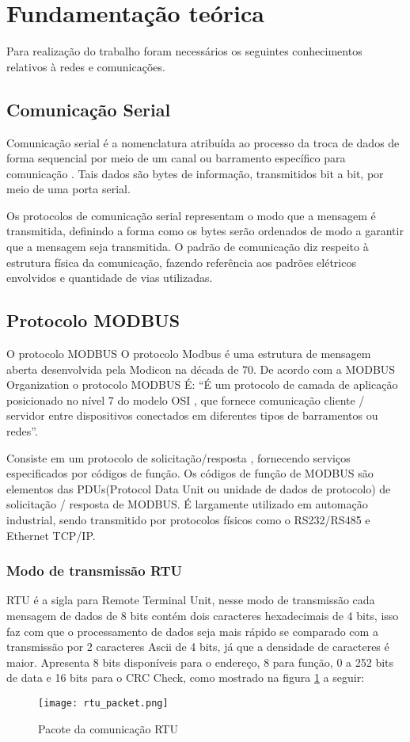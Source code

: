 \section{Fundamentação teórica}
Para realização do trabalho foram necessários os seguintes conhecimentos relativos à redes e comunicações.
\subsection{Comunicação Serial}
Comunicação serial é a nomenclatura atribuída ao processo da troca de dados de forma sequencial por meio de um canal ou barramento específico para comunicação . Tais dados são bytes de informação, transmitidos bit a bit, por meio de uma porta serial.	

Os protocolos de comunicação serial representam o modo que a mensagem é transmitida, definindo a forma como os bytes serão ordenados de modo a garantir que a mensagem seja transmitida.
O padrão de comunicação diz respeito à estrutura física da comunicação, fazendo referência aos padrões elétricos envolvidos e quantidade de vias utilizadas.
\subsection{Protocolo MODBUS}
O protocolo MODBUS O protocolo Modbus é uma estrutura de mensagem aberta desenvolvida pela Modicon na década de 70. De acordo com a MODBUS Organization o protocolo MODBUS É:  “É um protocolo de camada de aplicação posicionado no nível 7 do modelo OSI , que fornece comunicação cliente / servidor entre dispositivos conectados em diferentes tipos de barramentos ou redes”. 

Consiste em um protocolo de solicitação/resposta , fornecendo serviços especificados por códigos de função. Os códigos de função de MODBUS são elementos das PDUs(Protocol Data Unit ou unidade de dados de protocolo) de solicitação / resposta de MODBUS.
É largamente utilizado em automação industrial, sendo transmitido por protocolos físicos como o RS232/RS485 e Ethernet TCP/IP. 

\subsubsection{Modo de transmissão RTU}
RTU é a sigla para Remote Terminal Unit, nesse modo de transmissão cada mensagem de dados de 8 bits contém dois caracteres hexadecimais de 4 bits, isso faz com que o processamento de dados seja mais rápido se comparado com a transmissão por 2 caracteres Ascii de 4 bits, já que a densidade de caracteres é maior. Apresenta 8 bits disponíveis para o endereço, 8 para função, 0 a 252 bits de data e 16 bits para o CRC Check, como mostrado na figura \ref{fig:rtu_packet} a seguir:
\begin{figure}[h]
	\centering
	\texttt{[image: rtu\_packet.png]}
	\caption{Pacote da comunicação RTU}
	\label{fig:rtu_packet}
\end{figure} 
